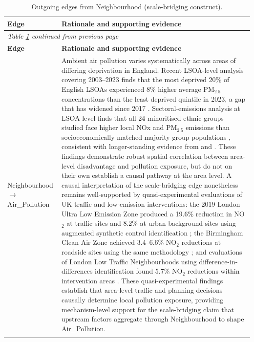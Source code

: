 \begin{longtable}{@{}p{3.8cm}p{11.2cm}@{}}
\caption{Outgoing edges from Neighbourhood (scale-bridging construct).}
\label{tab:edges-neighbourhood}\\
\toprule
\textbf{Edge} & \textbf{Rationale and supporting evidence} \\
\midrule
\endfirsthead
\multicolumn{2}{l}{\textit{Table \ref{tab:edges-neighbourhood} continued from previous page}}\\
\toprule
\textbf{Edge} & \textbf{Rationale and supporting evidence} \\
\midrule
\endhead
\bottomrule
\endfoot
Neighbourhood $\to$ Air\_Pollution & Ambient air pollution varies systematically across areas of differing deprivation in England. Recent LSOA-level analysis covering 2003--2023 finds that the most deprived 20\% of English LSOAs experienced 8\% higher average PM$_{2.5}$ concentrations than the least deprived quintile in 2023, a gap that has widened since 2017 \citep{gadenne_exposure_2024}. Sectoral-emissions analysis at LSOA level finds that all 24 minoritised ethnic groups studied face higher local NOx and PM$_{2.5}$ emissions than socioeconomically matched majority-group populations \citep{gray_evaluating_2024}, consistent with longer-standing evidence from \citet{fecht_associations_2015} and \citet{hajat_socioeconomic_2015}. These findings demonstrate robust spatial correlation between area-level disadvantage and pollution exposure, but do not on their own establish a causal pathway at the area level. A causal interpretation of the scale-bridging edge nonetheless remains well-supported by quasi-experimental evaluations of UK traffic and low-emission interventions: the 2019 London Ultra Low Emission Zone produced a 19.6\% reduction in NO$_2$ at traffic sites and 8.2\% at urban background sites using augmented synthetic control identification \citep{tong_further_2025}; the Birmingham Clean Air Zone achieved 3.4--6.6\% NO$_2$ reductions at roadside sites using the same methodology \citep{liu_assessing_2023}; and evaluations of London Low Traffic Neighbourhoods using difference-in-differences identification found 5.7\% NO$_2$ reductions within intervention areas \citep{yang_evaluation_2022}. These quasi-experimental findings establish that area-level traffic and planning decisions causally determine local pollution exposure, providing mechanism-level support for the scale-bridging claim that upstream factors aggregate through Neighbourhood to shape Air\_Pollution. \\
\addlinespace

\end{longtable}
